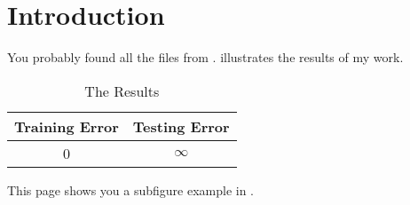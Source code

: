 \chapter{Introduction} \label{Chapter:Introduction}
You probably found all the files from \cite{Gunn:2001:pdflatex}.
 illustrates the results of my work.
\begin{table}[!htb]
  \centering
  \begin{tabular}{cc}
  \toprule
  \textbf{Training Error} & \textbf{Testing Error}\\
  \midrule
  0 & $\infty$\\
  \bottomrule
  \end{tabular}
  \caption{The Results}
  \label{Table:tabex}
\end{table}



This page shows you a subfigure example in .
